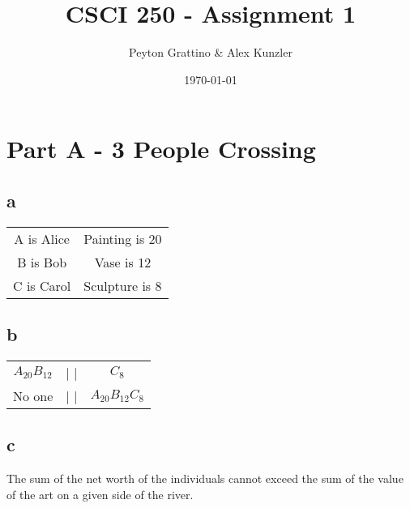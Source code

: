 \documentclass[12pt]{amsart}
\title{CSCI 250 - Assignment 1}
\author{Peyton Grattino \& Alex Kunzler}
\date{\today} %
\begin{document}
\maketitle
\tableofcontents

\pagebreak

\section*{Part A - 3 People Crossing}

\subsection*{a}
\begin{tabular}{ c c }
A is Alice & Painting is 20 \\
B is Bob & Vase is 12 \\
C is Carol & Sculpture is 8

\end{tabular}
\subsection*{b}
\begin{tabular}{ c c c }

$A_{20} B_{12}$ & | | & $C_{8}$ \\
No one & | | & $A_{20} B_{12} C_{8}$

\end{tabular}

\subsection*{c}
The sum of the net worth of the individuals cannot exceed the sum of the value of the art on a given side of the river.
\end{document}
